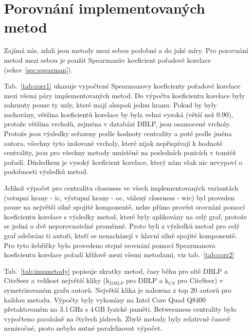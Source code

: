 \documentclass{bakalarka}
\begin{document}
\section{Porovnání implementovaných metod}
Zajímá nás, zdali jsou metody mezi sebou podobné a do jaké míry. Pro porovnání
metod mezi sebou je použit Spearmanův koeficient pořadové korelace
(sekce~\ref{sec:spearman}).


Tab.~\ref{tab:corr1} ukazuje vypočtené Spearmanovy koeficienty pořadové
korelace mezi všemi páry implementovaných metod. Do výpočtu koeficientu
korelace byly zahrnuty pouze ty uzly, které mají alespoň jednu hranu. Pokud by
byly zachovány, většina koeficientů korelace by byla velmi vysoká (větší než
$0.90$), protože většina vrcholů, zejména v databázi DBLP, jsou osamocené
vrcholy. Protože jsou výsledky seřazeny podle hodnoty centrality a poté podle
jména autora, všechny tyto izolované vrcholy, které nijak nepřispívají k
hodnotě centrality, jsou pro všechny metody umístěné na posledních pozicích v
tomtéž pořadí. Důsledkem je vysoký koeficient korelace, který nám však nic
nevypoví o podobnosti výsledků metod.

Jelikož výpočet pro centralitu closeness ve všech implementovaných variantách
(vstupní hrany - ic, výstupní hrany - oc, vážený closeness - wic) byl proveden
pouze na největší silně spojité komponentě, nelze přímo provést srovnání pomocí
koeficientu korelace s výsledky metod, které byly aplikovány na celý graf,
protože se jedná o dvě neporovnatelné proměnné. Proto byli z výsledků metod pro
celý graf odebráni ti autoři, kteří se nenacházejí v hlavní silně spojité
komponentě. Pro tyto žebříčky bylo provedeno stejné srovnání pomocí Spearmanova
koeficientu korelace pořadí křížově mezi všemi metodami, viz
tab.~\ref{tab:corr2}

Tab.~\ref{tab:impmetody} popisuje zkratky metod, časy běhu pro sítě DBLP a
CiteSeer a velikost největší kliky (k$_{DBLP}$ pro DBLP a k$_{CS}$ pro
CiteSeer) v symetrizovaném grafu autorů. Největší klika je nalezena z top 20
autorů pro každou metodu. Výpočty byly vykonány na Intel\textregistered
Core Quad Q8400 přetaktovaném na 3.1\,GHz s 4\,GB fyzické
paměti. Betweenness centrality bylo vypočteno paralalně na čtyřech jádrech.
Zbylé metody byly relativně časově nenáročné, proto nebylo nutné paralelizovat
výpočet.
\end{document}
